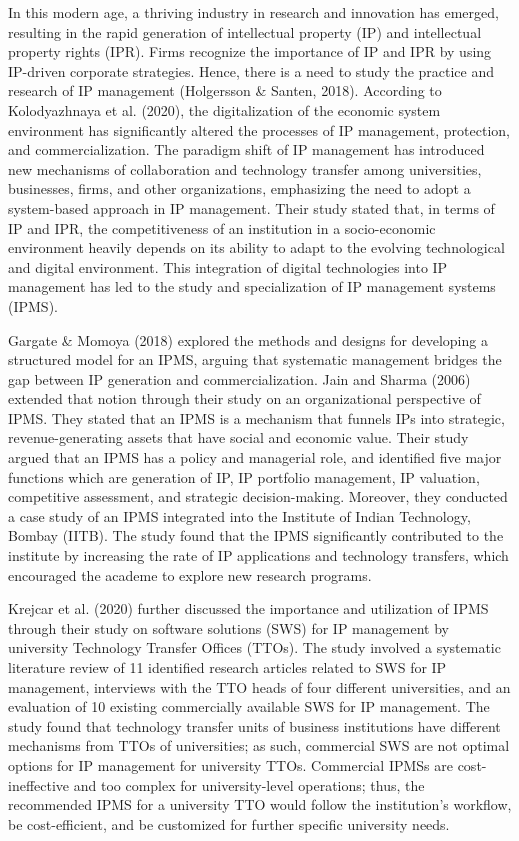 In this modern age, a thriving industry in research and innovation has emerged, resulting in the rapid generation of intellectual property (IP) and intellectual property rights (IPR). Firms recognize the importance of IP and IPR by using IP-driven corporate strategies. Hence, there is a need to study the practice and research of IP management (Holgersson \& Santen, 2018). According to Kolodyazhnaya et al. (2020), the digitalization of the economic system environment has significantly altered the processes of IP management, protection, and commercialization. The paradigm shift of IP management has introduced new mechanisms of collaboration and technology transfer among universities, businesses, firms, and other organizations, emphasizing the need to adopt a system-based approach in IP management. Their study stated that, in terms of IP and IPR, the competitiveness of an institution in a socio-economic environment heavily depends on its ability to adapt to the evolving technological and digital environment. This integration of digital technologies into IP management has led to the study and specialization of IP management systems (IPMS).

Gargate \& Momoya (2018) explored the methods and designs for developing a structured model for an IPMS, arguing that systematic management bridges the gap between IP generation and commercialization. 
Jain and Sharma (2006) extended that notion through their study on an organizational perspective of IPMS. 
They stated that an IPMS is a mechanism that funnels IPs into strategic, revenue-generating assets that have social and economic value. 
Their study argued that an IPMS has a policy and managerial role, and identified five major functions which are generation of IP, IP portfolio management, IP valuation, competitive assessment, and strategic decision-making.
Moreover, they conducted a case study of an IPMS integrated into the Institute of Indian Technology, Bombay (IITB). The study found that the IPMS significantly contributed to the institute by increasing the rate of IP applications and technology transfers, which encouraged the academe to explore new research programs.

Krejcar et al. (2020) further discussed the importance and utilization of IPMS through their study on software solutions (SWS) for IP management by university Technology Transfer Offices (TTOs). The study involved a systematic literature review of 11 identified research articles related to SWS for IP management, interviews with the TTO heads of four different universities, and an evaluation of 10 existing commercially available SWS for IP management. The study found that technology transfer units of business institutions have different mechanisms from TTOs of universities; as such, commercial SWS are not optimal options for IP management for university TTOs. Commercial IPMSs are cost-ineffective and too complex for university-level operations; thus, the recommended IPMS for a university TTO would follow the institution’s workflow, be cost-efficient, and be customized for further specific university needs.

